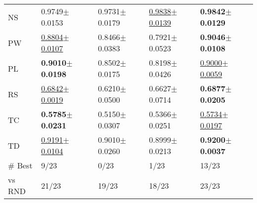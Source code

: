 \begin{tabular}{lllll}
NS & 0.9749$\pm$0.0153 & 0.9731$\pm$0.0179 & \underline{0.9838$\pm$0.0139} & \textbf{0.9842$\pm$0.0129} \\
PW & \underline{0.8804$\pm$0.0107} & 0.8466$\pm$0.0383 & 0.7921$\pm$0.0523 & \textbf{0.9046$\pm$0.0108} \\
PL & \textbf{0.9010$\pm$0.0198} & 0.8502$\pm$0.0175 & 0.8198$\pm$0.0426 & \underline{0.9000$\pm$0.0059} \\
RS & \underline{0.6842$\pm$0.0019} & 0.6210$\pm$0.0500 & 0.6627$\pm$0.0714 & \textbf{0.6877$\pm$0.0205} \\
TC & \textbf{0.5785$\pm$0.0231} & 0.5150$\pm$0.0307 & 0.5366$\pm$0.0251 & \underline{0.5734$\pm$0.0197} \\
TD & \underline{0.9191$\pm$0.0104} & 0.9010$\pm$0.0260 & 0.8999$\pm$0.0213 & \textbf{0.9200$\pm$0.0037} \\
\midrule
\# Best & 9/23 & 0/23 & 1/23 & 13/23 \\
vs RND & 21/23 & 19/23 & 18/23 & 23/23 \\
\bottomrule
\end{tabular}
